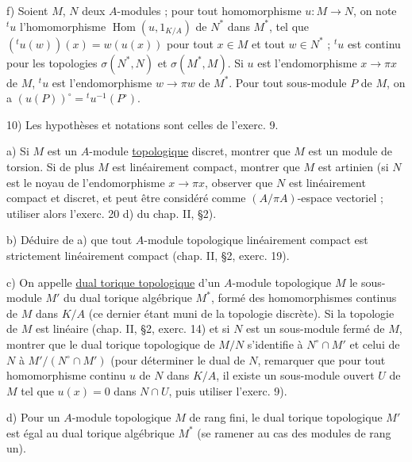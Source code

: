 f) Soient $M$, $N$ deux $A$-modules ; pour tout homomorphisme $u:M\longrightarrow N$, on note ${}^tu$ l'homomorphisme $\operatorname{Hom}(u,1_{K/A})$ de $N^*$ dans $M^*$, tel que $({}^tu(w))(x)=w(u(x))$ pour tout $x\in M$ et tout $w\in N^*$ ; ${}^tu$ est continu pour les topologies $\sigma(N^*,N)$ et $\sigma(M^*,M)$. Si $u$ est l'endomorphisme $x\longrightarrow\pi x$ de $M$, ${}^tu$ est l'endomorphisme $w\longrightarrow\pi w$ de $M^*$. Pour tout sous-module $P$ de $M$, on a $(u(P))^\circ={}^tu^{-1}(P^\circ)$.

10) Les hypothèses et notations sont celles de l'exerc. 9.

a) Si $M$ est un $A$-module \uline{topologique} discret, montrer que $M$ est un module de torsion. Si de plus $M$ est linéairement compact, montrer que $M$ est artinien (si $N$ est le noyau de l'endomorphisme $x\longrightarrow\pi x$, observer que $N$ est linéairement compact et discret, et peut être considéré comme $(A/\pi A)$-espace vectoriel ; utiliser alors l'exerc. 20 d) du chap. II, \S 2).

b) Déduire de a) que tout $A$-module topologique linéairement compact est strictement linéairement compact (chap. II, \S 2, exerc. 19).

c) On appelle \uline{dual torique topologique} d'un $A$-module topologique $M$ le sous-module $M'$ du dual torique algébrique $M^*$, formé des homomorphismes continus de $M$ dans $K/A$ (ce dernier étant muni de la topologie discrète). Si la topologie de $M$ est linéaire (chap. II, \S 2, exerc. 14) et si $N$ est un sous-module fermé de $M$, montrer que le dual torique topologique de $M/N$ s'identifie à $N^\circ\cap M'$ et celui de $N$ à $M'/(N^\circ\cap M')$ (pour déterminer le dual de $N$, remarquer que pour tout homomorphisme continu $u$ de $N$ dans $K/A$, il existe un sous-module ouvert $U$ de $M$ tel que $u(x)=0$ dans $N\cap U$, puis utiliser l'exerc. 9).

d) Pour un $A$-module topologique $M$ de rang fini, le dual torique topologique $M'$ est égal au dual torique algébrique $M^*$ (se ramener au cas des modules de rang un).

